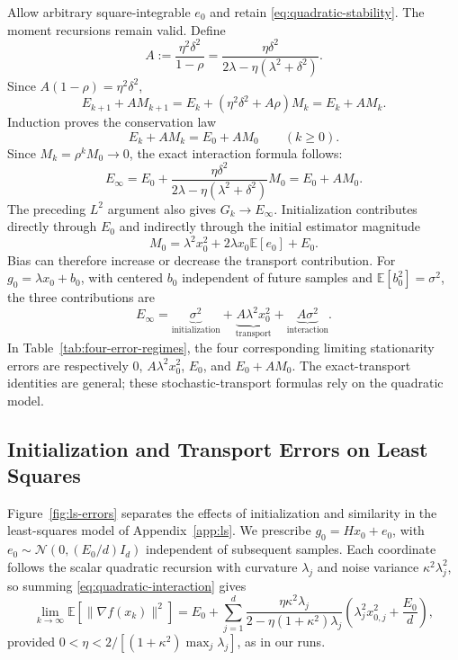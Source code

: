 Allow arbitrary square-integrable $e_0$ and retain
\eqref{eq:quadratic-stability}. The moment recursions remain valid.
Define
\begin{equation}
\label{eq:quadratic-A}
A:=\frac{\eta^2\delta^2}{1-\rho}
=\frac{\eta\delta^2}{2\lambda-\eta(\lambda^2+\delta^2)}.
\end{equation}
Since $A(1-\rho)=\eta^2\delta^2$,
\[
E_{k+1}+AM_{k+1}
=E_k+(\eta^2\delta^2+A\rho)M_k=E_k+AM_k.
\]
Induction proves the conservation law
\begin{equation}
\label{eq:quadratic-conservation}
E_k+AM_k=E_0+AM_0\qquad(k\geq0).
\end{equation}
Since $M_k=\rho^kM_0\to0$, the exact interaction formula follows:
\begin{equation}
\label{eq:quadratic-interaction}
\boxed{E_\infty=E_0+
\frac{\eta\delta^2}{2\lambda-\eta(\lambda^2+\delta^2)}M_0
=E_0+AM_0.}
\end{equation}
The preceding $L^2$ argument also gives $G_k\to E_\infty$.
Initialization contributes directly through $E_0$ and indirectly
through the initial estimator magnitude
\[
M_0=\lambda^2x_0^2+2\lambda x_0\mathbb E[e_0]+E_0.
\]
Bias can therefore increase or decrease the transport contribution.
For $g_0=\lambda x_0+b_0$, with centered $b_0$ independent of future
samples and $\mathbb E[b_0^2]=\sigma^2$, the three contributions are
\begin{equation}
\label{eq:quadratic-three-contributions}
E_\infty
=\underbrace{\sigma^2}_{\text{initialization}}
+\underbrace{A\lambda^2x_0^2}_{\text{transport}}
+\underbrace{A\sigma^2}_{\text{interaction}}.
\end{equation}
In Table~\ref{tab:four-error-regimes}, the four corresponding limiting
stationarity errors are respectively $0$, $A\lambda^2x_0^2$,
$E_0$, and $E_0+AM_0$. The exact-transport identities are general;
these stochastic-transport formulas rely on the quadratic model.

\subsection{Initialization and Transport Errors on Least Squares}
\label{app:quad-numerics}

Figure~\ref{fig:ls-errors} separates the effects of initialization and
similarity in the least-squares model of Appendix~\ref{app:ls}.
We prescribe $g_0=Hx_0+e_0$, with
$e_0\sim\mathcal N(0,(E_0/d)I_d)$ independent of subsequent samples.
Each coordinate follows the scalar quadratic recursion with curvature
$\lambda_j$ and noise variance $\kappa^2\lambda_j^2$, so summing
\eqref{eq:quadratic-interaction} gives
\begin{equation}
\label{eq:least-squares-residual}
\lim_{k\to\infty}\mathbb E[\|\nabla f(x_k)\|^2]
=E_0+\sum_{j=1}^d
\frac{\eta\kappa^2\lambda_j}{2-\eta(1+\kappa^2)\lambda_j}
\left(\lambda_j^2x_{0,j}^2+\frac{E_0}{d}\right),
\end{equation}
provided $0<\eta<2/[(1+\kappa^2)\max_j\lambda_j]$, as in our runs.

